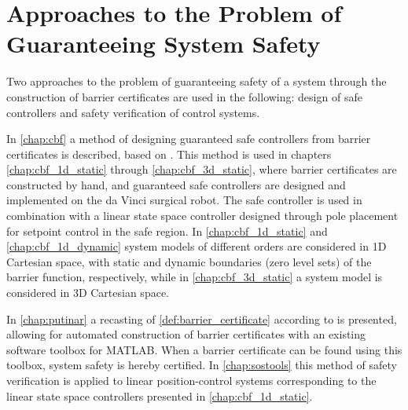 \section{Approaches to the Problem of Guaranteeing System Safety}
Two approaches to the problem of guaranteeing safety of a system through the construction of barrier certificates are used in the following: design of safe controllers and safety verification of control systems.

In \autoref{chap:cbf} a method of designing guaranteed safe controllers from barrier certificates is described, based on \citep{bib:org_control}. This method is used in chapters \ref{chap:cbf_1d_static} through \ref{chap:cbf_3d_static}, where barrier certificates are constructed by hand, and guaranteed safe controllers are designed and implemented on the da Vinci surgical robot. The safe controller is used in combination with a linear state space controller designed through pole placement for setpoint control in the safe region. In \autoref{chap:cbf_1d_static} and \ref{chap:cbf_1d_dynamic} system models of different orders are considered in 1D Cartesian space, with static and dynamic boundaries (zero level sets) of the barrier function, respectively, while in \autoref{chap:cbf_3d_static} a system model is considered in 3D Cartesian space. 

In \autoref{chap:putinar} a recasting of \autoref{def:barrier_certificate}  according to \citep{bib:sos_putinar_lasserre} is presented, allowing for automated construction of barrier certificates with an existing software toolbox for MATLAB. 
When a barrier certificate can be found using this toolbox, system safety is hereby certified.
In \autoref{chap:sostools} this method of safety verification is applied to linear position-control systems corresponding to the linear state space controllers presented in \autoref{chap:cbf_1d_static}.










